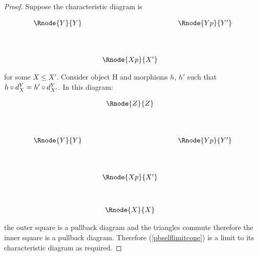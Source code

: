 \documentclass[10pt,a4paper]{scrartcl}
\begin{document}
\begin{proof}
Suppose the characteristic diagram is 
\begin{center}
\begin{displaymath}
\begin{array}{cp{0.3cm}c    p{0.3cm}  c }
\Rnode{Y}{Y}   &&                               & & \Rnode{Yp}{Y'}   \\ [1.4cm]
               & & \Rnode{Xp}{X'} & &   
\end{array}
\end{displaymath}
\end{center}
for some $X \leq X'$. Consider object H and morphisms $h$, $h'$ such that $h \circ d^{Y}_{X} = h' \circ d^{Y}_{X'}$. In this diagram:

\begin{center}
\begin{displaymath}
\begin{array}{cp{0.3cm}c    p{0.3cm}  c }
               & & \Rnode{Z}{Z}   & &                  \\ [1.4cm]
\Rnode{Y}{Y}   &&                 & & \Rnode{Yp}{Y'}   \\ [1.4cm]
               & & \Rnode{Xp}{X'} & &                  \\ [1.2cm]
							 & & \Rnode{X}{X}   & &   
\end{array}
\end{displaymath}
\end{center}
the outer square is a pullback diagram and the triangles commute therefore the inner square is  a pullback diagram. Therefore (\ref{pbselflimitcone}) is a limit to its characteristic diagram as required.

\end{proof}
\end{document}
